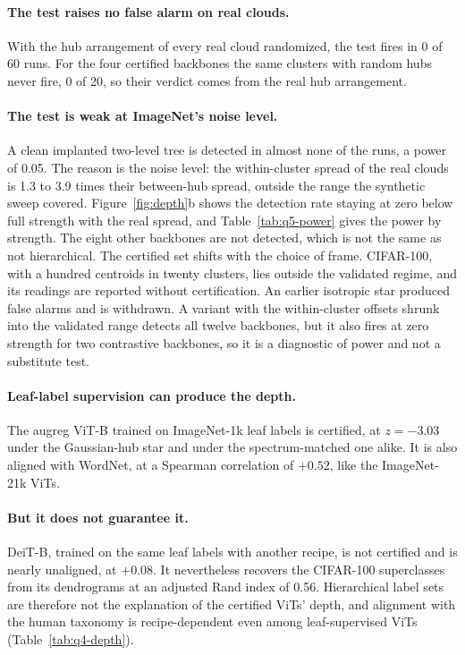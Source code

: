 \documentclass{article}
\theoremstyle{definition}
\theoremstyle{plain}
\theoremstyle{remark}
\begin{document}
\paragraph{The test raises no false alarm on real clouds.} With the hub arrangement of every real cloud randomized, the test fires in 0 of 60 runs. For the four certified backbones the same clusters with random hubs never fire, 0 of 20, so their verdict comes from the real hub arrangement. %

\paragraph{The test is weak at ImageNet's noise level.} A clean implanted two-level tree is detected in almost none of the runs, a power of 0.05. The reason is the noise level: the within-cluster spread of the real clouds is 1.3 to 3.9 times their between-hub spread, outside the range the synthetic sweep covered. Figure~\ref{fig:depth}b shows the detection rate staying at zero below full strength with the real spread, and Table~\ref{tab:q5-power} gives the power by strength. The eight other backbones are not detected, which is not the same as not hierarchical. The certified set shifts with the choice of frame. CIFAR-100, with a hundred centroids in twenty clusters, lies outside the validated regime, and its readings are reported without certification. An earlier isotropic star produced false alarms and is withdrawn. A variant with the within-cluster offsets shrunk into the validated range detects all twelve backbones, but it also fires at zero strength for two contrastive backbones, so it is a diagnostic of power and not a substitute test. %

\paragraph{Leaf-label supervision can produce the depth.} The augreg ViT-B trained on ImageNet-1k leaf labels is certified, at $z=-3.03$ under the Gaussian-hub star and under the spectrum-matched one alike. It is also aligned with WordNet, at a Spearman correlation of $+0.52$, like the ImageNet-21k ViTs. %

\paragraph{But it does not guarantee it.} DeiT-B, trained on the same leaf labels with another recipe, is not certified and is nearly unaligned, at $+0.08$. It nevertheless recovers the CIFAR-100 superclasses from its dendrograms at an adjusted Rand index of 0.56. Hierarchical label sets are therefore not the explanation of the certified ViTs' depth, and alignment with the human taxonomy is recipe-dependent even among leaf-supervised ViTs (Table~\ref{tab:q4-depth}). %
\end{document}
